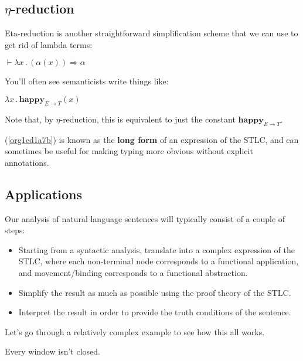 \documentclass[letterpaper,parskip=half]{scrartcl}
\begin{document}
\subsection{\(\eta\)-reduction}
\label{sec:orgbfcb37b}

Eta-reduction is another straightforward simplification scheme that we can use to get rid of lambda terms:

\begin{exe}
\ex \(\vdash \lambda x\,.\,(\alpha(x))\Rightarrow \alpha\)
\label{org9d4f5e8}
\end{exe}

You'll often see semanticists write things like:

\begin{exe}
\ex \(\lambda x\,.\,\mathbf{happy}_{E \to T}(x)\)
\label{org1ed1a7b}
\end{exe}

Note that, by \(\eta\)-reduction, this is equivalent to just the constant \(\mathbf{happy}_{E \to T}\).

(\ref{org1ed1a7b}) is known as the \textbf{long form} of an expression of the STLC, and can sometimes be useful for making typing more obvious without explicit annotations.  

\subsection{Applications}
\label{sec:orgb6644fa}

Our analysis of natural language sentences will typically consist of a couple of steps:

\begin{itemize}
\item Starting from a syntactic analysis, translate into a complex expression of the STLC, where each non-terminal node corresponds to a functional application, and movement/binding corresponds to a functional abstraction.
\item Simplify the result as much as possible using the proof theory of the STLC.
\item Interpret the result in order to provide the truth conditions of the sentence.
\end{itemize}

Let's go through a relatively complex example to see how this all works.

\begin{exe}
\ex Every window isn't closed.
\label{orgddf0a94}
\end{exe}
\end{document}

